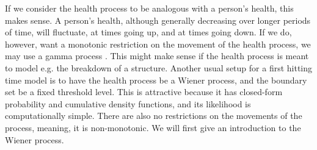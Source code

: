If we consider the health process to be analogous with a person's health, this makes sense. A person's health, although generally decreasing over longer periods of time, will fluctuate, at times going up, and at times going down. If we do, however, want a monotonic restriction on the movement of the health process, we may use a gamma process \citep{leewhitmore2006}. This might make sense if the health process is meant to model e.g. the breakdown of a structure. Another usual setup for a first hitting time model is to have the health process be a Wiener process, and the boundary set be a fixed threshold level. This is attractive because it has closed-form probability and cumulative density functions, and its likelihood is computationally simple. There are also no restrictions on the movements of the process, meaning, it is non-monotonic. We will first give an introduction to the Wiener process.

